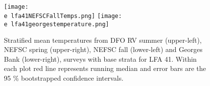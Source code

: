 \documentclass[11pt]{article}
\newcommand{\e}{/SpinDr/backup/bio_data/bio.lobster/figures/} %
\begin{document}

\begin{figure}

  \\
    \texttt{[image: \\e lfa41NEFSCFallTemps.png]}
    \texttt{[image: \\e lfa41georgestemperature.png]}\\
   
    \caption{Stratified mean temperatures from DFO RV summer (upper-left), NEFSC spring (upper-right), NEFSC fall (lower-left) and Georges Bank (lower-right), surveys with base strata for LFA 41. Within each plot red line represents running median and error bars are the 95 \% bootstrapped confidence intervals.}

\end{figure}
\end{document}
